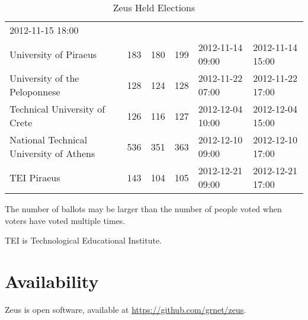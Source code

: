 \documentclass[letterpaper,twocolumn,10pt]{article}
\begin{document}
\begin{table*}[t]
\begin{threeparttable}
\begin{tabular}{llllll}
      2012-11-15 18:00\\
      University of Piraeus & 183 & 180 & 199 & 2012-11-14 09:00 & 
      2012-11-14 15:00\\
      University of the Peloponnese & 128 & 124 & 128 &
      2012-11-22 07:00 & 2012-11-22 17:00\\
      Technical University of Crete & 126 & 116 & 127 & 
      2012-12-04 10:00 & 2012-12-04 15:00\\
      National Technical University of Athens & 536 & 351 & 363 &
      2012-12-10 09:00 & 2012-12-10 17:00\\
      TEI Piraeus & 143 & 104 & 105 & 2012-12-21 09:00 & 2012-12-21 17:00\\
    \end{tabular}
    \begin{tablenotes}
      \small 
      \item The number of ballots may be larger than the number of
      people voted when voters have voted multiple times.
      \item TEI is Technological Educational Institute. 
    \end{tablenotes}
  \end{threeparttable}
  \caption{Zeus Held Elections\label{table:zeus-elections}}
\end{table*}



\section{Availability}

Zeus is open software, available at \url{https://github.com/grnet/zeus}.

{\footnotesize


}
\end{document}
